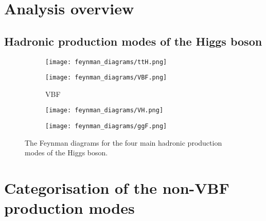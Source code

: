 





\section{Analysis overview}
\label{sec:htoinv_overview}




\subsection{Hadronic production modes of the Higgs boson}
\label{subsec:htoinv_production_modes}

\begin{figure}[htbp]
    \centering
    \begin{subfigure}[b]{0.45\textwidth}
        \texttt{[image: feynman\_diagrams/ttH.png]}
        \caption{\ttH}
    \end{subfigure}
    \hfill
    \begin{subfigure}[b]{0.45\textwidth}
        \texttt{[image: feynman\_diagrams/VBF.png]}
        \caption{VBF}
    \end{subfigure}
    \begin{subfigure}[b]{0.45\textwidth}
        \texttt{[image: feynman\_diagrams/VH.png]}
        \caption{\VH}
    \end{subfigure}
    \hfill
    \begin{subfigure}[b]{0.45\textwidth}
        \texttt{[image: feynman\_diagrams/ggF.png]}
        \caption{\ggF}
    \end{subfigure}
\caption[The Feynman diagrams for the four main hadronic production modes of the Higgs boson]{The Feynman diagrams for the four main hadronic production modes of the Higgs boson.}
\label{fig:higgs_feynman_diagrams}
\end{figure}




\section{Categorisation of the non-VBF production modes}
\label{sec:htoinv_categorisation}


